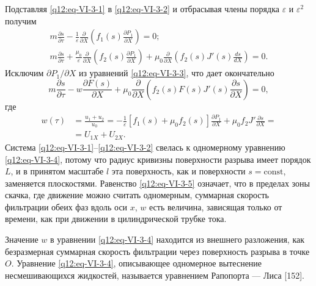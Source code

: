 Подставляя \eqref{q12:eq-VI-3-1} в \eqref{q12:eq-VI-3-2} и отбрасывая члены порядка $\varepsilon$ и $\varepsilon^2$ получим
\begin{equation}\begin{gathered}
m\frac{\partial s}{\partial\tau}-\frac1\varepsilon\frac{\partial}{\partial X}\left(f_1(s)\frac{\partial P_1}{\partial X}\right)=0;\\
m\frac{\partial s}{\partial\tau}+\frac{\mu_0}{\varepsilon}\frac{\partial}{\partial X}\left(f_2(s)\frac{\partial P_1}{\partial X}\right)+\mu_0\frac{\partial}{\partial X}\left(f_2(s)J'(s)\frac{ds}{dX}\right)=0.
\end{gathered}\tag{VI.3.3}\label{q12:eq-VI-3-3}\end{equation}
Исключим $\partial P_1/\partial X$ из уравнений \eqref{q12:eq-VI-3-3}, что дает окончательно
\begin{equation}m\frac{\partial s}{\partial\tau}-w\frac{\partial F(s)}{\partial X}+\mu_0\frac{\partial}{\partial X}\left(f_2(s)F(s)J'(s)\frac{\partial s}{\partial X}\right)=0,\tag{VI.3.4}\label{q12:eq-VI-3-4}\end{equation}
где
\begin{equation}\begin{aligned}
w(\tau)&=\frac{u_1+u_2}{u_0}=-\frac1\varepsilon[f_1(s)+\mu_0f_2(s)]\frac{\partial P_1}{\partial X}+\mu_0f_2J'\frac{\partial s}{\partial X}=\\
&=U_{1X}+U_{2X}.
\end{aligned}\tag{VI.3.5}\label{q12:eq-VI-3-5}\end{equation}
Система \eqref{q12:eq-VI-3-1}--\eqref{q12:eq-VI-3-2} свелась к одномерному уравнению \eqref{q12:eq-VI-3-4}, потому что радиус кривизны поверхности разрыва имеет порядок $L$, и в принятом масштабе $l$ эта поверхность, как и поверхности $s=\mathrm{const}$, заменяется плоскостями. Равенство \eqref{q12:eq-VI-3-5} означает, что в пределах зоны скачка, где движение можно считать одномерным, суммарная скорость фильтрации обеих фаз вдоль оси $x$, $w$ есть величина, зависящая только от времени, как при движении в цилиндрической трубке тока.

Значение $w$ в уравнении \eqref{q12:eq-VI-3-4} находится из внешнего разложения, как безразмерная суммарная скорость фильтрации через поверхность разрыва в точке $O$. Уравнение \eqref{q12:eq-VI-3-4}, описывающее одномерное вытеснение несмешивающихся жидкостей, называется уравнением Рапопорта --- Лиса [152].


